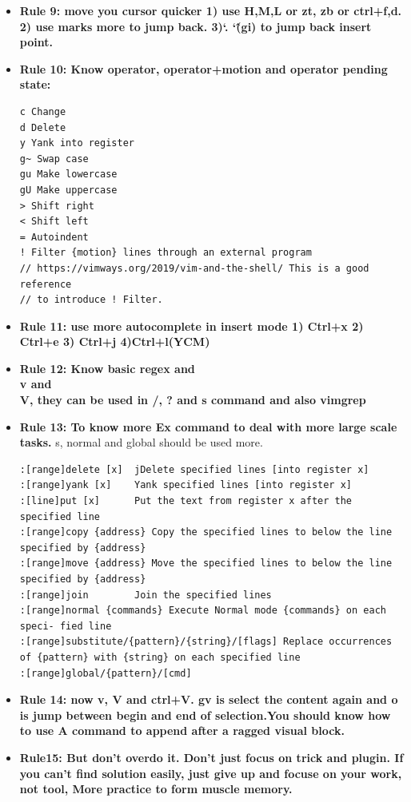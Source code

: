 \documentclass[a4paper,11pt,twoside]{book}
\begin{document}
\begin{itemize}
        \item \textbf{Rule 9: move you cursor quicker 1) use H,M,L or zt, zb or ctrl+f,d. 2) use marks more to jump back. 3)`. `\^(gi) to jump back insert point.}

        \item \textbf{Rule 10: Know operator, operator+motion and operator pending state:}
\begin{verbatim}
c Change
d Delete
y Yank into register
g~ Swap case
gu Make lowercase
gU Make uppercase
> Shift right
< Shift left
= Autoindent
! Filter {motion} lines through an external program
// https://vimways.org/2019/vim-and-the-shell/ This is a good reference 
// to introduce ! Filter.
\end{verbatim}	
        \item \textbf{Rule 11: use more autocomplete in insert mode 1) Ctrl+x 2) Ctrl+e 3) Ctrl+j 4)Ctrl+l(YCM)}

        \item \textbf{Rule 12: Know basic regex and \\v and \\V, they can be used in /, ? and s command and also vimgrep}

        \item \textbf{Rule 13: To know more Ex command to deal with more large scale tasks.} s, normal and global should be used more. 

\begin{verbatim}
:[range]delete [x]  jDelete specified lines [into register x]
:[range]yank [x]    Yank specified lines [into register x]
:[line]put [x]      Put the text from register x after the specified line
:[range]copy {address} Copy the specified lines to below the line specified by {address}
:[range]move {address} Move the specified lines to below the line specified by {address}
:[range]join        Join the specified lines
:[range]normal {commands} Execute Normal mode {commands} on each speci- fied line
:[range]substitute/{pattern}/{string}/[flags] Replace occurrences of {pattern} with {string} on each specified line 
:[range]global/{pattern}/[cmd]
\end{verbatim}

        \item \textbf{Rule 14: now v, V and ctrl+V. gv is select the content again and o is jump between begin and end of selection.You should know how to use A command to append after a ragged visual block.} 


		\item \textbf{Rule15: But don't overdo it. Don't just focus on trick and plugin. If you can't find solution easily, just give up and focuse on your work, not tool, More practice to form muscle memory.}


\end{itemize}
\end{document}
